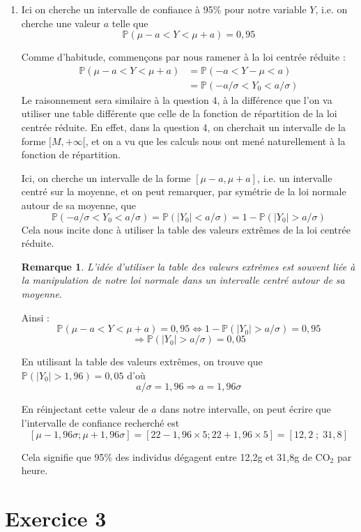 \documentclass[a4paper,oneside,12pt]{article}
\theoremstyle{plain}
\newtheorem*{remark}{Remarque}
\def\P{{\mathbb P}}
\begin{document}
\begin{enumerate}
    \item Ici on cherche un intervalle de confiance à 95\% pour notre variable $Y$, i.e. on cherche une valeur $a$ telle que $$\P(\mu-a < Y < \mu +a) = 0,95$$
    
    Comme d'habitude, commençons par nous ramener à la loi centrée réduite :
    \begin{align*}
        \P(\mu-a < Y < \mu +a) &= \P(-a < Y-\mu < a)\\
        &= \P(-a/\sigma < Y_0 < a/\sigma)
    \end{align*}
    Le raisonnement sera similaire à la question 4, à la différence que l'on va utiliser une table différente que celle de la fonction de répartition de la loi centrée réduite. En effet, dans la question 4, on cherchait un intervalle de la forme $[M,+\infty[$, et on a vu que les calculs nous ont mené naturellement à la fonction de répartition. 
    
    Ici, on cherche un intervalle de la forme $[\mu-a,\mu+a]$, i.e. un intervalle centré sur la moyenne, et on peut remarquer, par symétrie de la loi normale autour de sa moyenne, que $$\P(-a/\sigma < Y_0 < a/\sigma) = \P(|Y_0|< a/\sigma) = 1 -\P(|Y_0|>a/\sigma)$$
    Cela nous incite donc à utiliser la table des valeurs extrêmes de la loi centrée réduite.
    
    \begin{remark}
        L'idée d'utiliser la table des valeurs extrêmes est souvent liée à la manipulation de notre loi normale dans un intervalle centré autour de sa moyenne.
    \end{remark}
    
    Ainsi :
    $$\P(\mu-a < Y < \mu +a) = 0,95 \Leftrightarrow  1 -\P(|Y_0|>a/\sigma) = 0,95 $$
    $$\Longrightarrow \P(|Y_0|>a/\sigma) = 0,05$$
    
    En utilisant la table des valeurs extrêmes, on trouve que $\P(|Y_0|>1,96) = 0,05$ d'où $$a/\sigma = 1,96 \Rightarrow a = 1, 96 \sigma$$
    
    En réinjectant cette valeur de $a$ dans notre intervalle, on peut écrire que l'intervalle de confiance recherché est $$[\mu-1,96 \sigma; \mu + 1,96 \sigma] = [22-1,96\times 5; 22+1,96\times 5] = [12,2\;;\;31,8]$$
    
    Cela signifie que 95\% des individus dégagent entre 12,2g et 31,8g de $\mbox{CO}_2$ par heure.
    
\end{enumerate}

\section*{Exercice 3}
\end{document}
